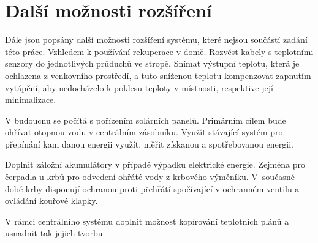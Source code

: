 \chapter{Další možnosti rozšíření}
Dále jsou popsány další možnosti rozšíření systému, které nejsou součástí zadání této práce. Vzhledem k používání rekuperace v domě. Rozvést kabely s teplotními senzory do jednotlivých průduchů ve stropě. Snímat výstupní teplotu, která je ochlazena z venkovního prostředí, a tuto sníženou teplotu kompenzovat zapnutím vytápění, aby nedocházelo k poklesu teploty v místnosti, respektive její minimalizace.

V budoucnu se počítá s pořízením solárních panelů. Primárním cílem bude ohřívat otopnou vodu v centrálním zásobníku. Využít stávající systém pro přepínání kam danou energii využít, měřit získanou a spotřebovanou energii.

Doplnit záložní akumulátory v případě výpadku elektrické energie. Zejména pro čerpadla u krbů pro odvedení ohřáté vody z krbového výměníku. V~současné době krby disponují ochranou proti přehřátí spočívající v ochranném ventilu a ovládání kouřové klapky.

V rámci centrálního systému doplnit možnost kopírování teplotních plánů a usnadnit tak jejich tvorbu. 